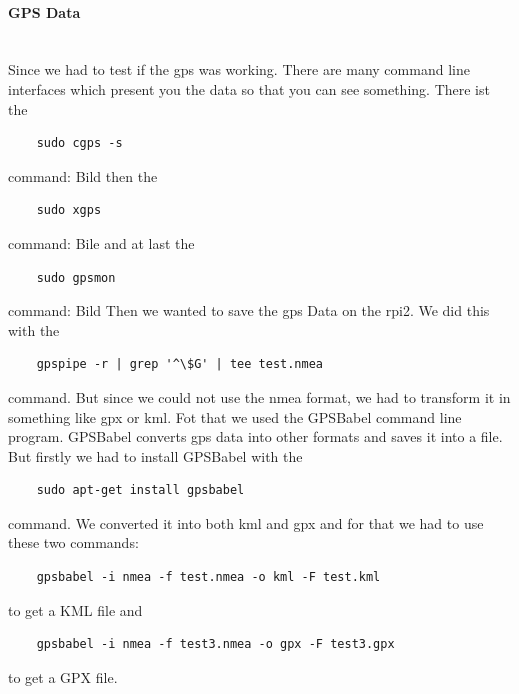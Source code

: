\paragraph{GPS Data} \mbox{}\\
Since we had to test if the \gls{gps} was working. There are many command line interfaces which present you the data so that you can see something.\newline
There ist the 
\begin{verbatim}
	sudo cgps -s
\end{verbatim}
command:\newline
Bild
\newline
then the
\begin{verbatim}
	sudo xgps
\end{verbatim}
command:\newline
Bile
\newline
and at last the 
\begin{verbatim}
	sudo gpsmon
\end{verbatim}
command:\newline
Bild
\newline
Then we wanted to save the \gls{gps} Data on the \gls{rpi2}. We did this with the 
\begin{verbatim}
	gpspipe -r | grep '^\$G' | tee test.nmea 
\end{verbatim}
command.
But since we could not use the \gls{nmea} format, we had to transform it in something like \gls{gpx} or \gls{kml}. Fot that we used the GPSBabel command line program. GPSBabel converts \gls{gps} data into other formats and saves it into a file. But firstly we had to install GPSBabel with the 
\begin{verbatim}
	sudo apt-get install gpsbabel 
\end{verbatim}
command. We converted it into both \gls{kml} and \gls{gpx} and for that we had to use these two commands: 

\begin{verbatim}
	gpsbabel -i nmea -f test.nmea -o kml -F test.kml
\end{verbatim}
to get a KML file and
\begin{verbatim}
	gpsbabel -i nmea -f test3.nmea -o gpx -F test3.gpx
\end{verbatim}
to get a GPX file.
